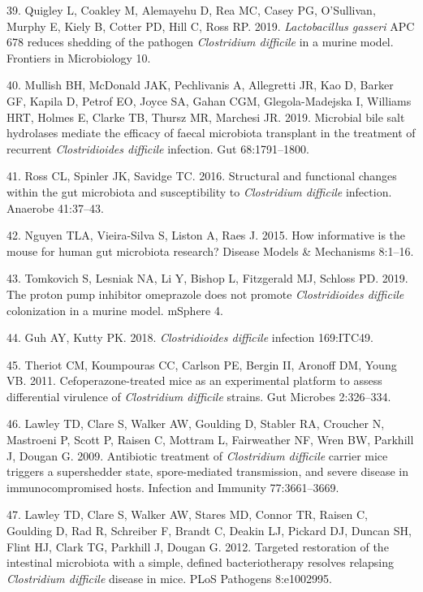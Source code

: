 \documentclass[11pt,]{article}
\begin{document}
\hypertarget{ref-Quigley2019}{}
39. Quigley L, Coakley M, Alemayehu D, Rea MC, Casey PG, O'Sullivan,
Murphy E, Kiely B, Cotter PD, Hill C, Ross RP. 2019. \emph{Lactobacillus
gasseri} APC 678 reduces shedding of the pathogen \emph{Clostridium
difficile} in a murine model. Frontiers in Microbiology 10.

\hypertarget{ref-Mullish2019}{}
40. Mullish BH, McDonald JAK, Pechlivanis A, Allegretti JR, Kao D,
Barker GF, Kapila D, Petrof EO, Joyce SA, Gahan CGM, Glegola-Madejska I,
Williams HRT, Holmes E, Clarke TB, Thursz MR, Marchesi JR. 2019.
Microbial bile salt hydrolases mediate the efficacy of faecal microbiota
transplant in the treatment of recurrent \emph{Clostridioides difficile}
infection. Gut 68:1791--1800.

\hypertarget{ref-Ross2016}{}
41. Ross CL, Spinler JK, Savidge TC. 2016. Structural and functional
changes within the gut microbiota and susceptibility to
\emph{Clostridium difficile} infection. Anaerobe 41:37--43.

\hypertarget{ref-Nguyen2015}{}
42. Nguyen TLA, Vieira-Silva S, Liston A, Raes J. 2015. How informative
is the mouse for human gut microbiota research? Disease Models \&
Mechanisms 8:1--16.

\hypertarget{ref-Tomkovich2019}{}
43. Tomkovich S, Lesniak NA, Li Y, Bishop L, Fitzgerald MJ, Schloss PD.
2019. The proton pump inhibitor omeprazole does not promote
\emph{Clostridioides difficile} colonization in a murine model. mSphere
4.

\hypertarget{ref-Guh2018}{}
44. Guh AY, Kutty PK. 2018. \emph{Clostridioides difficile} infection
169:ITC49.

\hypertarget{ref-Theriot2011}{}
45. Theriot CM, Koumpouras CC, Carlson PE, Bergin II, Aronoff DM, Young
VB. 2011. Cefoperazone-treated mice as an experimental platform to
assess differential virulence of \emph{Clostridium difficile} strains.
Gut Microbes 2:326--334.

\hypertarget{ref-Lawley2009}{}
46. Lawley TD, Clare S, Walker AW, Goulding D, Stabler RA, Croucher N,
Mastroeni P, Scott P, Raisen C, Mottram L, Fairweather NF, Wren BW,
Parkhill J, Dougan G. 2009. Antibiotic treatment of \emph{Clostridium
difficile} carrier mice triggers a supershedder state, spore-mediated
transmission, and severe disease in immunocompromised hosts. Infection
and Immunity 77:3661--3669.

\hypertarget{ref-Lawley2012}{}
47. Lawley TD, Clare S, Walker AW, Stares MD, Connor TR, Raisen C,
Goulding D, Rad R, Schreiber F, Brandt C, Deakin LJ, Pickard DJ, Duncan
SH, Flint HJ, Clark TG, Parkhill J, Dougan G. 2012. Targeted restoration
of the intestinal microbiota with a simple, defined bacteriotherapy
resolves relapsing \emph{Clostridium difficile} disease in mice. PLoS
Pathogens 8:e1002995.
\end{document}
